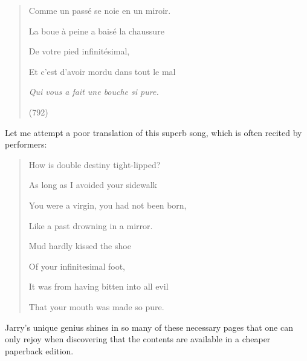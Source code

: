 \begin{review}
\begin{quote}
Comme un passé se noie en un miroir.

La boue à peine a baisé la chaussure

De votre pied infinitésimal,

Et c'est d'avoir mordu dans tout le mal

\emph{Qui vous a fait une bouche si pure.}
\begin{flushright}
 (792)   
\end{flushright}
\end{quote}

\noindent Let me attempt a poor translation of this superb song, which is often
recited by performers:
\begin{quote}
How is double destiny tight-lipped?

As long as I avoided your sidewalk

You were a virgin, you had not been born,

Like a past drowning in a mirror.

Mud hardly kissed the shoe

Of your infinitesimal foot,

It was from having bitten into all evil

That your mouth was made so pure.
\end{quote}

\noindent Jarry's unique genius shines in so many of these necessary pages that
one can only rejoy when discovering that the contents are available in a
cheaper paperback edition.


\begin{flushleft}
    \renewcommand*{\mkbibnamefamily}[1]{\textsc{#1}}
    \renewcommand*{\mkbibnamegiven}[1]{\textsc{#1}} 
\printbibliography
\end{flushleft}

\end{review}